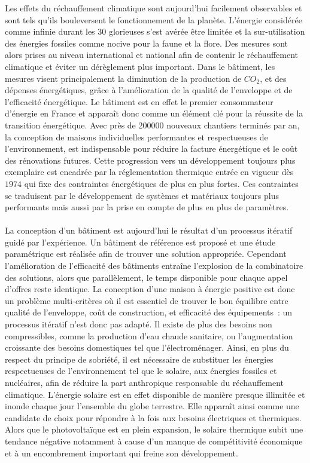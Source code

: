 

Les effets du réchauffement climatique sont aujourd’hui facilement observables et sont
tels qu’ils bouleversent le fonctionnement de la planète. L’énergie considérée comme
infinie durant les \num{30} glorieuses s’est avérée être limitée et la sur-utilisation des
énergies fossiles comme nocive pour la faune et la flore. Des mesures sont alors prises au
niveau international et national afin de contenir le réchauffement climatique et éviter un
dérèglement plus important. Dans le bâtiment, les mesures visent principalement la
diminution de la production de $CO_{2}$, et des dépenses énergétiques, grâce à
l’amélioration de la qualité de l’enveloppe et de l’efficacité énergétique. Le bâtiment
est en effet le premier consommateur d’énergie en France et apparaît donc comme un élément
clé pour la réussite de la transition énergétique. Avec près de \num{200000} nouveaux
chantiers terminés par an, la conception de maisons individuelles performantes et
respectueuses de l’environnement, est indispensable pour réduire la facture énergétique et
le coût des rénovations futures. Cette progression vers un développement toujours plus
exemplaire est encadrée par la réglementation thermique entrée en vigueur dès $1974$ qui
fixe des contraintes énergétiques de plus en plus fortes. Ces contraintes
se traduisent par le développement de systèmes et matériaux toujours plus performants
mais aussi par la prise en compte de plus en plus de paramètres.


\paragraph{} %
La conception d’un bâtiment est aujourd’hui le résultat d’un processus itératif guidé par
l’expérience. Un bâtiment de référence est proposé et une étude paramétrique est réalisée
afin de trouver une solution appropriée. Cependant l’amélioration de l’efficacité des
bâtiments entraîne l’explosion de la combinatoire des solutions, alors que parallèlement,
le temps disponible pour chaque appel d’offres reste identique. La conception d’une
maison à énergie positive est donc un problème multi-critères où il est essentiel de
trouver le bon équilibre entre qualité de l’enveloppe, coût de construction, et efficacité
des équipements~: un processus itératif n’est donc pas adapté. Il existe de plus des
besoins non compressibles, comme la production d’eau chaude sanitaire, ou l’augmentation
croissante des besoins domestiques tel que l’électroménager. Ainsi, en plus du respect du
principe de sobriété, il est nécessaire de substituer les énergies respectueuses de
l’environnement tel que le solaire, aux énergies fossiles et nucléaires, afin de réduire la
part anthropique responsable du réchauffement climatique. L’énergie solaire est en effet
disponible de manière presque illimitée et inonde chaque jour l’ensemble du globe
terrestre. Elle apparaît ainsi comme une candidate de choix pour répondre à la fois aux
besoins électriques et thermiques. Alors que le photovoltaïque est en plein expansion, le
solaire thermique subit une tendance négative notamment à cause d’un manque de
compétitivité économique et à un encombrement important qui freine son développement.

